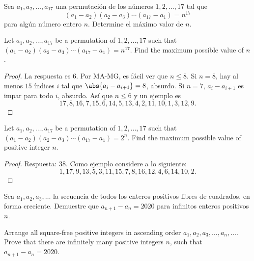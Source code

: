 \begin{probMG}[CSMO 2020/10.4]
	Sea $a_1,a_2,\dots,a_{17}$ una permutación de los números $1,2,\dots,17$ tal que
	\[(a_1-a_2)(a_2-a_3)\cdots(a_{17}-a_1)=n^{17}\]
	para algún número entero $n$. Determine el máximo valor de $n$.
	\begin{hint}
		Let $a_1,a_2,\dots,a_{17}$ be a permutation of $1,2,\dots,17$ such that $(a_1-a_2)(a_2-a_3)\cdots(a_{17}-a_1)=n^{17}$. Find the maximum possible value of $n$.
	\end{hint}
\end{probMG}

\begin{proof}
	La respuesta es $6$. Por MA-MG, es fácil ver que $n\le 8$. Si $n=8$, hay al menos $15$ índices $i$ tal que $\abs{a_i-a_{i+1}}=8$, absurdo. Si $n=7$, $a_i-a_{i+1}$ es impar para todo $i$, absurdo. Así que $n\le 6$ y un ejemplo es
	\[17,8,16,7,15,6,14,5,13,4,2,11,10,1,3,12,9.\]
\end{proof}

\begin{probEG}[CSMO 2020/11.1]
	Let $a_1,a_2,\dots,a_{17}$ be a permutation of $1,2,\dots,17$ such that $(a_1-a_2)(a_2-a_3)\cdots(a_{17}-a_1)=2^n$. Find the maximum possible value of positive integer $n$.
\end{probEG}

\begin{proof}
	Respuesta: $38$. Como ejemplo considere a lo siguiente:
	\[1,17,9,13,5,3,11,15,7,8,16,12,4,6,14,10,2.\]
\end{proof}

\begin{probMR}[CSMO 2020/11.7]
	Sea $a_1,a_2,a_3,\dots$ la secuencia de todos los enteros positivos libres de cuadrados, en forma creciente. Demuestre que $a_{n+1}-a_n=2020$ para infinitos enteros positivos $n$.
	\begin{hint}
		Arrange all square-free positive integers in ascending order $a_1,a_2,a_3,\dots,a_n,\dots$. Prove that there are infinitely many positive integers $n$, such that $a_{n+1}-a_n=2020$.
	\end{hint}
\end{probMR}

